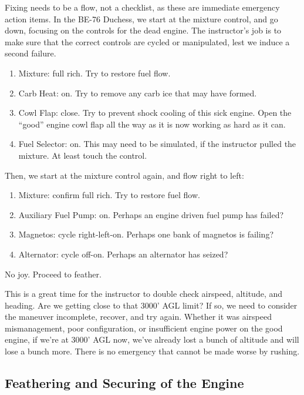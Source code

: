 Fixing needs to be a flow, not a checklist, as these are immediate emergency action items. In the BE-76 Duchess, we start at the mixture control, and go down, focusing on the controls for the dead engine. The instructor's job is to make sure that the correct controls are cycled or manipulated, lest we induce a second failure.

\begin{enumerate}
    \item Mixture: full rich. Try to restore fuel flow.
    \item Carb Heat: on. Try to remove any carb ice that may have formed.
    \item Cowl Flap: close. Try to prevent shock cooling of this sick engine. Open the ``good'' engine cowl flap all the way as it is now working as hard as it can.
    \item Fuel Selector: on. This may need to be simulated, if the instructor pulled the mixture. At least touch the control.
\end{enumerate}

Then, we start at the mixture control again, and flow right to left:

\begin{enumerate}
    \item Mixture: confirm full rich. Try to restore fuel flow.
    \item Auxiliary Fuel Pump: on. Perhaps an engine driven fuel pump has failed?
    \item Magnetos: cycle right-left-on. Perhaps one bank of magnetos is failing?
    \item Alternator: cycle off-on. Perhaps an alternator has seized?
\end{enumerate}

No joy. Proceed to feather.

This is a great time for the instructor to double check airspeed, altitude, and heading. Are we getting close to that 3000' AGL limit? If so,
we need to consider the maneuver incomplete, recover, and try again. Whether it was airspeed mismanagement, poor configuration, or
insufficient engine power on the good engine, if we're at 3000' AGL now, we've already lost a bunch of altitude and will lose a
bunch more. There is no emergency that cannot be made worse by rushing.

\subsection{Feathering and Securing of the Engine}

